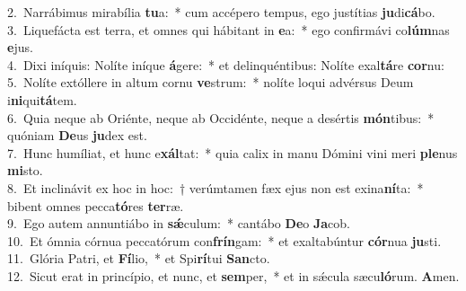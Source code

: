 {2.~}Narrábimus mirabília \textbf{tu}a:~* cum accépero tempus, ego justítias \textbf{ju}di\textbf{cá}bo.\\
{3.~}Liquefácta est terra, et omnes qui hábitant in \textbf{e}a:~* ego confirmávi co\textbf{lúm}nas \textbf{e}jus.\\
{4.~}Dixi iníquis: Nolíte iníque \textbf{á}gere:~* et delinquéntibus: Nolíte exal\textbf{tá}re \textbf{cor}nu:\\
{5.~}Nolíte extóllere in altum cornu \textbf{ve}strum:~* nolíte loqui advérsus Deum i\textbf{ni}qui\textbf{tá}tem.\\
{6.~}Quia neque ab Oriénte, neque ab Occidénte, neque a desértis \textbf{món}tibus:~* quóniam \textbf{De}us \textbf{ju}dex est.\\
{7.~}Hunc humíliat, et hunc e\textbf{xál}tat:~* quia calix in manu Dómini vini meri \textbf{ple}nus \textbf{mi}sto.\\
{8.~}Et inclinávit ex hoc in hoc:~† verúmtamen fæx ejus non est exina\textbf{ní}ta:~* bibent omnes pecca\textbf{tó}res \textbf{ter}ræ.\\
{9.~}Ego autem annuntiábo in \textbf{sǽ}culum:~* cantábo \textbf{De}o \textbf{Ja}cob.\\
{10.~}Et ómnia córnua peccatórum con\textbf{frín}gam:~* et exaltabúntur \textbf{cór}nua \textbf{ju}sti.\\
{11.~}Glória Patri, et \textbf{Fí}lio,~* et Spi\textbf{rí}tui \textbf{San}cto.\\
{12.~}Sicut erat in princípio, et nunc, et \textbf{sem}per,~* et in sǽcula sæcu\textbf{ló}rum. \textbf{A}men.\\
